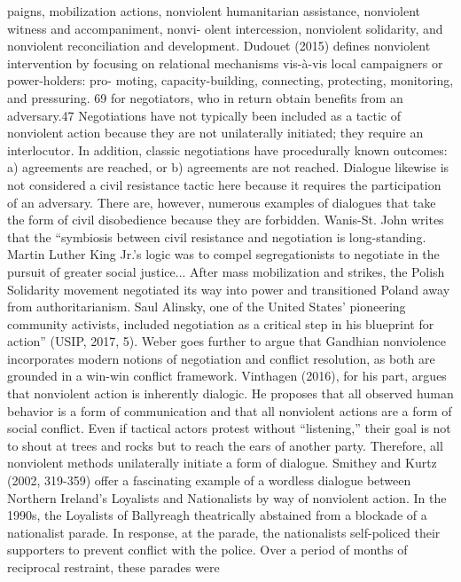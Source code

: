 \documentclass[twoside,a4paper,12pt,fleqn,openany]{extbook}
\begin{document}
paigns, mobilization actions, nonviolent humanitarian assistance, nonviolent witness and accompaniment, nonvi-
olent intercession, nonviolent solidarity, and nonviolent reconciliation and development. Dudouet (2015) defines
nonviolent intervention by focusing on relational mechanisms vis-à-vis local campaigners or power-holders: pro-
moting, capacity-building, connecting, protecting, monitoring, and pressuring.
69
for negotiators, who in return obtain benefits from an adversary.47 Negotiations have not
typically been included as a tactic of nonviolent action because they are not unilaterally
initiated; they require an interlocutor. In addition, classic negotiations have procedurally
known outcomes: a) agreements are reached, or b) agreements are not reached. Dialogue
likewise is not considered a civil resistance tactic here because it requires the participation
of an adversary. There are, however, numerous examples of dialogues that take the form of
civil disobedience because they are forbidden.
Wanis-St. John writes that the “symbiosis between civil resistance and negotiation is
long-standing. Martin Luther King Jr.’s logic was to compel segregationists to negotiate in the
pursuit of greater social justice... After mass mobilization and strikes, the Polish Solidarity
movement negotiated its way into power and transitioned Poland away from authoritarianism.
Saul Alinsky, one of the United States’ pioneering community activists, included negotiation
as a critical step in his blueprint for action” (USIP, 2017, 5).
Weber goes further to argue that Gandhian nonviolence incorporates modern notions
of negotiation and conflict resolution, as both are grounded in a win-win conflict framework.
Vinthagen (2016), for his part, argues that nonviolent action is inherently dialogic. He proposes
that all observed human behavior is a form of communication and that all nonviolent actions
are a form of social conflict. Even if tactical actors protest without “listening,” their goal is not
to shout at trees and rocks but to reach the ears of another party. Therefore, all nonviolent
methods unilaterally initiate a form of dialogue.
Smithey and Kurtz (2002, 319-359) offer a fascinating example of a wordless dialogue
between Northern Ireland’s Loyalists and Nationalists by way of nonviolent action. In the
1990s, the Loyalists of Ballyreagh theatrically abstained from a blockade of a nationalist
parade. In response, at the parade, the nationalists self-policed their supporters to prevent
conflict with the police. Over a period of months of reciprocal restraint, these parades were
\end{document}
